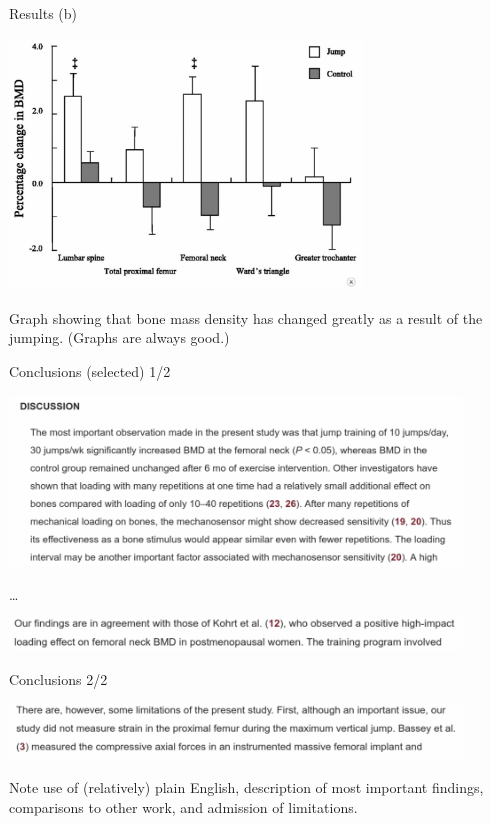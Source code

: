 \documentclass[
  ignorenonframetext,
]{beamer}
\begin{document}
\begin{frame}{Results (b)}
\protect\hypertarget{results-b}{}

\includegraphics[width=0.7\textwidth]{resultsb}

Graph showing that bone mass density has changed greatly as a result of
the jumping. (Graphs are always good.)

\end{frame}

\begin{frame}{Conclusions (selected) 1/2}
\protect\hypertarget{conclusions-selected-12}{}

\includegraphics[width=0.9\textwidth]{conc1}

\ldots{}

\includegraphics[width=0.9\textwidth]{conc2}

\end{frame}

\begin{frame}{Conclusions 2/2}
\protect\hypertarget{conclusions-22}{}

\includegraphics[width=0.9\textwidth]{conc3}

Note use of (relatively) plain English, description of most important
findings, comparisons to other work, and admission of limitations.

\end{frame}
\end{document}
